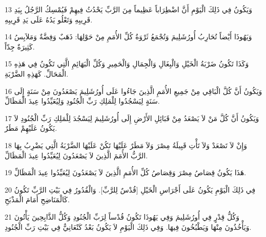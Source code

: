 \par 13 وَيَكُونُ فِي ذَلِكَ الْيَوْمِ أَنَّ اضْطِرَاباً عَظِيماً مِنَ الرَّبِّ يَحْدُثُ فِيهِمْ فَيُمْسِكُ الرَّجُلُ بِيَدِ قَرِيبِهِ وَتَعْلُو يَدُهُ عَلَى يَدِ قَرِيبِهِ.
\par 14 وَيَهُوذَا أَيْضاً تُحَارِبُ أُورُشَلِيمَ وَتُجْمَعُ ثَرْوَةُ كُلِّ الأُمَمِ مِنْ حَوْلِهَا: ذَهَبٌ وَفِضَّةٌ وَمَلاَبِسُ كَثِيرَةٌ جِدّاً.
\par 15 وَكَذَا تَكُونُ ضَرْبَةُ الْخَيْلِ وَالْبِغَالِ وَالْجِمَالِ وَالْحَمِيرِ وَكُلِّ الْبَهَائِمِ الَّتِي تَكُونُ فِي هَذِهِ الْمَحَالِّ. كَهَذِهِ الضَّرْبَةِ.
\par 16 وَيَكُونُ أَنَّ كُلَّ الْبَاقِي مِنْ جَمِيعِ الأُمَمِ الَّذِينَ جَاءُوا عَلَى أُورُشَلِيمَ يَصْعَدُونَ مِنْ سَنَةٍ إِلَى سَنَةٍ لِيَسْجُدُوا لِلْمَلِكِ رَبِّ الْجُنُودِ وَلِيُعَيِّدُوا عِيدَ الْمَظَالِّ.
\par 17 وَيَكُونُ أَنَّ كُلَّ مَنْ لاَ يَصْعَدُ مِنْ قَبَائِلِ الأَرْضِ إِلَى أُورُشَلِيمَ لِيَسْجُدَ لِلْمَلِكِ رَبِّ الْجُنُودِ لاَ يَكُونُ عَلَيْهِمْ مَطَرٌ.
\par 18 وَإِنْ لاَ تَصْعَدْ وَلاَ تَأْتِ قَبِيلَةُ مِصْرَ وَلاَ مَطَرٌ عَلَيْهَا تَكُنْ عَلَيْهَا الضَّرْبَةُ الَّتِي يَضْرِبُ بِهَا الرَّبُّ الأُمَمَ الَّذِينَ لاَ يَصْعَدُونَ لِيُعَيِّدُوا عِيدَ الْمَظَالِّ.
\par 19 هَذَا يَكُونُ قِصَاصُ مِصْرَ وَقِصَاصُ كُلِّ الأُمَمِ الَّذِينَ لاَ يَصْعَدُونَ لِيُعَيِّدُوا عِيدَ الْمَظَالِّ.
\par 20 فِي ذَلِكَ الْيَوْمِ يَكُونُ عَلَى أَجْرَاسِ الْخَيْلِ [قُدْسٌ لِلرَّبِّ]. وَالْقُدُورُ فِي بَيْتِ الرَّبِّ تَكُونُ كَالْمَنَاضِحِ أَمَامَ الْمَذْبَحِ.
\par 21 وَكُلُّ قِدْرٍ فِي أُورُشَلِيمَ وَفِي يَهُوذَا تَكُونُ قُدْساً لِرَبِّ الْجُنُودِ وَكُلُّ الذَّابِحِينَ يَأْتُونَ وَيَأْخُذُونَ مِنْهَا وَيَطْبُخُونَ فِيهَا. وَفِي ذَلِكَ الْيَوْمِ لاَ يَكُونُ بَعْدُ كَنْعَانِيٌّ فِي بَيْتِ رَبِّ الْجُنُودِ.

